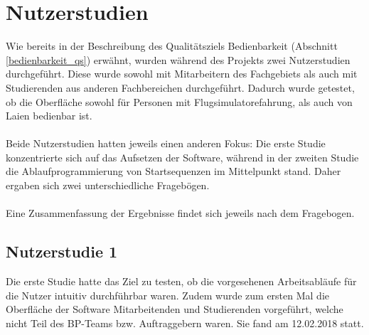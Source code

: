 \section{Nutzerstudien}
Wie bereits in der Beschreibung des Qualitätsziels Bedienbarkeit (Abschnitt \ref{bedienbarkeit_qs})
erwähnt, wurden während des Projekts zwei Nutzerstudien durchgeführt. Diese wurde sowohl mit
Mitarbeitern des Fachgebiets als auch mit Studierenden aus anderen Fachbereichen durchgeführt.
Dadurch wurde getestet, ob die Oberfläche sowohl für Personen mit Flugsimulatorefahrung, als auch
von Laien bedienbar ist.
\\\\
Beide Nutzerstudien hatten jeweils einen anderen Fokus:
Die erste Studie konzentrierte sich auf das Aufsetzen der Software, während in der zweiten Studie
die Ablaufprogrammierung von Startsequenzen im Mittelpunkt stand. Daher ergaben sich zwei unterschiedliche
Fragebögen.
\\\\
Eine Zusammenfassung der Ergebnisse findet sich jeweils nach dem Fragebogen.

\subsection{Nutzerstudie 1}
Die erste Studie hatte das Ziel zu testen, ob die vorgesehenen Arbeitsabläufe für die Nutzer
intuitiv durchführbar waren. Zudem wurde zum ersten Mal die Oberfläche der Software Mitarbeitenden und Studierenden
vorgeführt, welche nicht Teil des BP-Teams bzw. Auftraggebern waren. Sie fand am 12.02.2018 statt.


